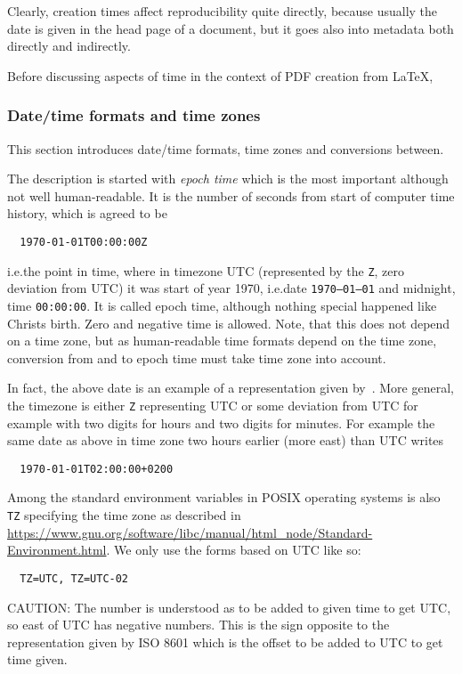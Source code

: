 \documentclass[a4paper, english]{article}%
\begin{document}
Clearly, creation times affect reproducibility quite directly, 
because usually the date is given in the head page of a document, 
but it goes also into metadata both directly and indirectly. 

Before discussing aspects of time in the context of PDF creation from \LaTeX, 


\subsubsection{Date/time formats and time zones}\label{subsubsec:dateTimeZones}

This section introduces date/time formats, time zones and conversions between. 

The description is started with \emph{epoch time} 
which is the most important although not well human-readable. 
It is the number of seconds from start of computer time history, 
which is agreed to be 
%
\begin{verbatim}
  1970-01-01T00:00:00Z
\end{verbatim}
%
i.e.\@ the point in time, where in timezone UTC (represented by the \texttt Z, zero deviation from UTC) 
it was start of year 1970, i.e.\@ date \texttt{1970--01--01} and midnight, time \texttt{00:00:00}. 
It is called epoch time, although nothing special happened like Christs birth. 
Zero and negative time is allowed. 
Note, that this does not depend on a time zone, 
but as human-readable time formats depend on the time zone, 
conversion from and to epoch time must take time zone into account. 

In fact, the above date is an example of a representation given by~\cite{ISO8601-1}. 
More general, the timezone is either \texttt Z representing UTC 
or some deviation from UTC for example with two digits for hours and two digits for minutes. 
For example the same date as above in time zone two hours earlier (more east) than UTC writes 
%
\begin{verbatim}
  1970-01-01T02:00:00+0200
\end{verbatim}

Among the standard environment variables in POSIX operating systems 
is also \texttt{TZ} specifying the time zone 
as described in \url{https://www.gnu.org/software/libc/manual/html_node/Standard-Environment.html}. 
We only use the forms based on UTC like so: 
%
\begin{verbatim}
  TZ=UTC, TZ=UTC-02
\end{verbatim}
%
CAUTION\@: The number is understood as to be added to given time to get UTC, 
so east of UTC has negative numbers. 
This is the sign opposite to the representation given by ISO 8601 
which is the offset to be added to UTC to get time given. 
\end{document}
